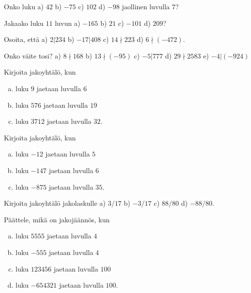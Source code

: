 \setcounter{tehtava}{0}

\begin{kotitehtavasivu}

\begin{tehtava}
	Onko luku a) $42$ b) $-75$ c) $102$ d) $-98$ jaollinen luvulla $7$?
\end{tehtava}

\begin{tehtava}
	Jakaako luku $11$ luvun a) $-165$ b) $21$ c) $-101$ d) $209$?
\end{tehtava}

\begin{tehtava}
	Osoita, että a) $2|234$ b) $-17|408$ c) $14 \nmid 223$ d) $6 \nmid (-472)$.
\end{tehtava}

\begin{tehtava}
	Onko väite tosi? a) $8 \nmid 168$ b) $13 \nmid (-95)$ c) $-5|777$ d) $29\nmid 2583$ e) $-4|(-924)$
\end{tehtava}

\begin{tehtava}
	Kirjoita jakoyhtälö, kun
	\begin{enumerate}[a)]
	\item luku $9$ jaetaan luvulla $6$
	\item luku $576$ jaetaan luvulla $19$
	\item luku $3712$ jaetaan luvulla $32$.
	\end{enumerate}
\end{tehtava}

\begin{tehtava}
	Kirjoita jakoyhtälö, kun
	\begin{enumerate}[a)]
	\item luku $-12$ jaetaan luvulla $5$
	\item luku $-147$ jaetaan luvulla $6$
	\item luku $-875$ jaetaan luvulla $35$.
	\end{enumerate}
\end{tehtava}

\begin{tehtava}
	Kirjoita jakoyhtälö jakolaskulle a) $3/17$ b) $-3/17$ c) $88/80$ d) $-88/80$.
\end{tehtava}

\begin{tehtava}
	Päättele, mikä on jakojäännös, kun
	\begin{enumerate}[a)]
	\item luku $5555$ jaetaan luvulla $4$
	\item luku $-555$ jaetaan luvulla $4$
	\item luku $123456$ jaetaan luvulla $100$
	\item luku $-654321$ jaetaan luvulla $100$.
	\end{enumerate}
\end{tehtava}


\end{kotitehtavasivu}
